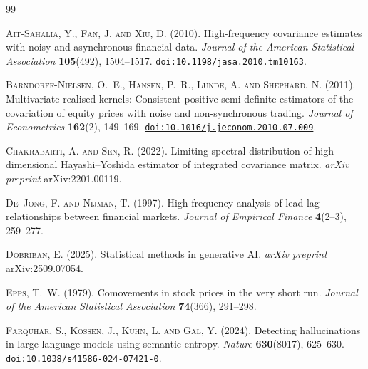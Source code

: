 \documentclass[reqno, 12pt]{amsart}
\newcommand{\doi}[1]{\href{https://doi.org/#1}{\texttt{doi:#1}}}
\theoremstyle{plain}
\theoremstyle{definition}
\theoremstyle{remark}
\begin{document}
\begin{thebibliography}{99}

\textsc{A\"{i}t-Sahalia, Y., Fan, J. and Xiu, D.} (2010).
High-frequency covariance estimates with noisy and asynchronous
financial data.
\textit{Journal of the American Statistical Association}
\textbf{105}(492), 1504--1517.
\doi{10.1198/jasa.2010.tm10163}.

\textsc{Barndorff-Nielsen, O.~E., Hansen, P.~R., Lunde, A.
  and Shephard, N.} (2011).
Multivariate realised kernels: Consistent positive semi-definite
estimators of the covariation of equity prices with noise and
non-synchronous trading.
\textit{Journal of Econometrics} \textbf{162}(2), 149--169.
\doi{10.1016/j.jeconom.2010.07.009}.

\textsc{Chakrabarti, A. and Sen, R.} (2022).
Limiting spectral distribution of high-dimensional {Hayashi--Yoshida}
estimator of integrated covariance matrix.
\textit{arXiv preprint} arXiv:2201.00119.

\textsc{De~Jong, F. and Nijman, T.} (1997).
High frequency analysis of lead-lag relationships between financial
markets.
\textit{Journal of Empirical Finance} \textbf{4}(2--3), 259--277.

\textsc{Dobriban, E.} (2025).
Statistical methods in generative {AI}.
\textit{arXiv preprint} arXiv:2509.07054.

\textsc{Epps, T.~W.} (1979).
Comovements in stock prices in the very short run.
\textit{Journal of the American Statistical Association}
\textbf{74}(366), 291--298.

\textsc{Farquhar, S., Kossen, J., Kuhn, L. and Gal, Y.} (2024).
Detecting hallucinations in large language models using semantic
entropy.
\textit{Nature} \textbf{630}(8017), 625--630.
\doi{10.1038/s41586-024-07421-0}.


\end{thebibliography}
\end{document}
